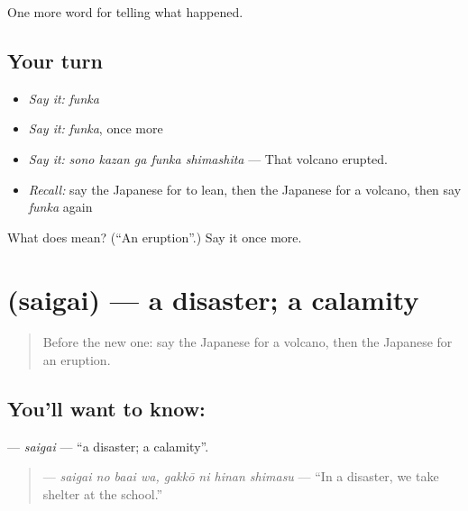 \begin{grammarlens}[title={What you've built}]
One more word for telling what happened.
\end{grammarlens}

\subsection*{Your turn}
\begin{itemize}
\raggedright
  \item \emph{Say it:} \emph{funka}
  \item \emph{Say it:} \emph{funka}, once more
  \item \emph{Say it:} \emph{sono kazan ga funka shimashita} — That volcano erupted.
  \item \emph{Recall:} say the Japanese for to lean, then the Japanese for a volcano, then say \emph{funka} again
\end{itemize}

\begin{tcolorbox}[breakable,colback=teal!4,colframe=teal!35!black,title={Before you move on}]
What does  mean? (\textquotedblleft{}An eruption\textquotedblright{}.) Say it once more.
\end{tcolorbox}
\section[\texorpdfstring{\ja{さいがい} (saigai)}{さいがい (saigai)}]{ (saigai) — a disaster; a calamity}

\label{lesson:JA-C279-saigai}



\begin{quote}
Before the new one: say the Japanese for a volcano, then the Japanese for an eruption.
\end{quote}

\subsection*{You'll want to know: }
\textbf{} — \emph{saigai} — \textquotedblleft{}a disaster; a calamity\textquotedblright{}.

\begin{quote}
\textbf{  } — \emph{saigai no baai wa, gakkō ni hinan shimasu} — \textquotedblleft{}In a disaster, we take shelter at the school.\textquotedblright{}
\end{quote}

